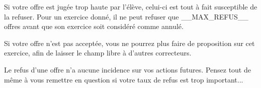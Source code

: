 ﻿Si votre offre est jugée trop haute par l'élève, celui-ci est tout à fait susceptible de la refuser. Pour un exercice donné, il ne peut refuser que __MAX_REFUS__ offres avant que son exercice soit considéré comme annulé.

Si votre offre n'est pas acceptée, vous ne pourrez plus faire de proposition sur cet exercice, afin de laisser le champ libre à d'autres correcteurs.

Le refus d'une offre n'a aucune incidence sur vos actions futures. Pensez tout de même à vous remettre en question si votre taux de refus est trop important...